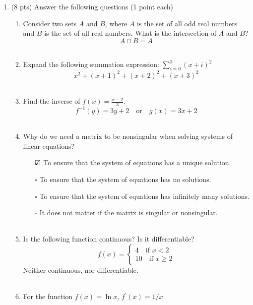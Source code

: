 \documentclass{./../../../Latex/tests}
\begin{document}
\thispagestyle{plain}

\vspace{0.5em}

\begin{enumerate}	

\item (8 pts) Answer the following questions (1 point each)
\begin{enumerate}
\item Consider two sets $A$ and $B$, where $A$ is the set of all odd real numbers and $B$ is the set of all real numbers. What is the intersection of $A$ and $B$? 
$$ A \cap B = A $$ \\
\item Expand the following summation expression: $\sum_{i=0}^{3}(x+i)^{2}$
$$ x^2 + (x+1)^2 + (x+2)^2 + (x+3)^2 $$ \\
\item Find the inverse of $f(x) = \frac{x-2}{3}$.
 $$ f^{-1}(y) = 3y+2 \quad \text{or} \quad g(x) =3x+2 $$ \\
\item Why do we need a matrix to be nonsingular when solving systems of linear equations?
\begin{itemize}
\item[$\text{\rlap{$\checkmark$}}\square$] To ensure that the system of equations has a unique solution.
\item[$\square$] To ensure that the system of equations has no solutions.
\item[$\square$] To ensure that the system of equations has infinitely many solutions.
\item[$\square$] It does not matter if the matrix is singular or nonsingular.  \\~\\
 \end{itemize}
\item Is the following function continuous? Is it differentiable?
$$ f(x) = \begin{cases}
	4 \quad \text{if } x<2 \\
	10 \quad \text{if } x\geq2
\end{cases} $$
Neither continuous, nor differentiable. \\~\\
\item For the function $f(x) = \ln x$, $f^{\prime} (x)=1/x$ 

\end{enumerate}
\end{enumerate}
\end{document}
